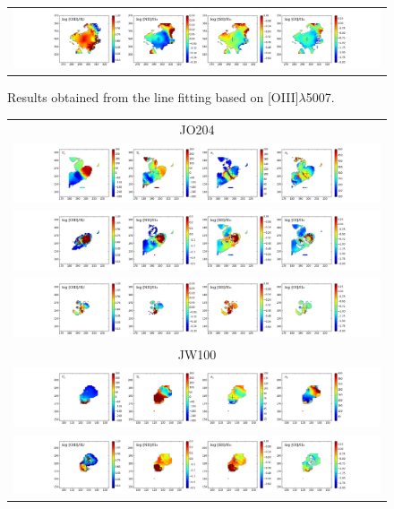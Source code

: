 \documentclass[fleqn,usenatbib]{mnras}
\begin{document}
\begin{figure}
\begin{tabular}{c}
		\includegraphics[width=1\linewidth]{Plots/JO201_fpars_b.png} \\
	\end{tabular} 
	\caption{Results obtained from the line fitting based on [OIII]$\lambda$5007.\label{fig:fpars}}
\end{figure}

\begin{figure}
	\begin{tabular}{c}
		JO204\\
		\includegraphics[width=1\linewidth]{Plots/JO204_fpars_kin.png}\\
		\includegraphics[width=1\linewidth]{Plots/JO204_fpars_n.png}\\
		\includegraphics[width=1\linewidth]{Plots/JO204_fpars_b.png}\\		
		JW100\\
		\includegraphics[width=1\linewidth]{Plots/JW100_fpars_kin.png}\\
		\includegraphics[width=1\linewidth]{Plots/JW100_fpars_n.png}\\
	\end{tabular} 
	\contcaption{}
\end{figure}
\end{document}

